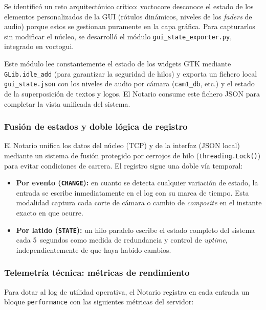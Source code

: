 Se identificó un reto arquitectónico crítico: voctocore desconoce el estado de los
elementos personalizados de la GUI (rótulos dinámicos, niveles de los \textit{faders}
de audio) porque estos se gestionan puramente en la capa gráfica. Para capturarlos
sin modificar el núcleo, se desarrolló el módulo \texttt{gui\_state\_exporter.py},
integrado en voctogui.

Este módulo lee constantemente el estado de los widgets GTK mediante
\texttt{GLib.idle\_add} (para garantizar la seguridad de hilos) y exporta un fichero
local \texttt{gui\_state.json} con los niveles de audio por cámara (\texttt{cam1\_db},
etc.) y el estado de la superposición de textos y logos. El Notario consume este
fichero JSON para completar la vista unificada del sistema.

\subsubsection{Fusión de estados y doble lógica de registro}

El Notario unifica los datos del núcleo (TCP) y de la interfaz (JSON local) mediante
un sistema de fusión protegido por cerrojos de hilo (\texttt{threading.Lock()}) para
evitar condiciones de carrera. El registro sigue una doble vía temporal:

\begin{itemize}
  \item \textbf{Por evento (\texttt{CHANGE}):} en cuanto se detecta cualquier variación
        de estado, la entrada se escribe inmediatamente en el log con su marca de
        tiempo. Esta modalidad captura cada corte de cámara o cambio de \textit{composite} en
        el instante exacto en que ocurre.
  \item \textbf{Por latido (\texttt{STATE}):} un hilo paralelo escribe el estado
        completo del sistema cada 5~segundos como medida de redundancia y control de
        \textit{uptime}, independientemente de que haya habido cambios.
\end{itemize}

\subsubsection{Telemetría técnica: métricas de rendimiento}

Para dotar al log de utilidad operativa, el Notario registra en cada entrada un bloque
\texttt{performance} con las siguientes métricas del servidor:

